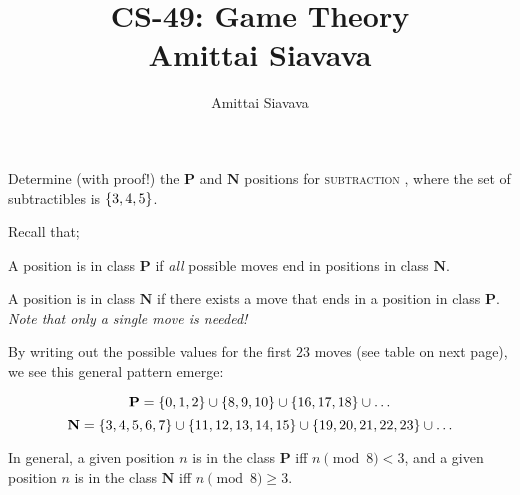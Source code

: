 \documentclass[11pt, reqno]{amsart}
\begin{document}

\title{CS-49: Game Theory\\ Amittai Siavava \\ }
\author{Amittai Siavava}


\setlength{\headheight}{13.0pt}
\setlength{\footskip}{15.0pt}

\maketitle

\bigskip

\def \cram { \textsc{cram} }
\def \dom { \textsc{domineering} }
\def \sub { \textsc{subtraction} }

\begin{problem}[5]
  Determine (with proof!) the $\mathbf{P}$ and $\mathbf{N}$ positions for \sub,
  where the set of subtractibles is $\left\{3,4,5\right\}$.

  \step
  Recall that;
  \begin{enumarabic}
    \item A position is in class $\mathbf{P}$ if \emph{all} possible moves end in positions
      in class $\mathbf{N}$.
    \item A position is in class $\mathbf{N}$ if there exists a move that ends in a
      position in class $\mathbf{P}$.\\
      \emph{Note that only a single move is needed!}
  \end{enumarabic}

  By writing out the possible values for the first $23$ moves (see table on next page),
  we see this general pattern emerge:

  \[\mathbf{P} = \left\{ 0, 1, 2\right\} \cup \left\{8, 9, 10\right\} \cup \left\{16, 17, 18\right\} \cup \ldots \]
  \[\mathbf{N} = \left\{3, 4, 5, 6, 7\right\} \cup \left\{11, 12, 13, 14, 15\right\} \cup \left\{19, 20, 21, 22, 23\right\} \cup \ldots \]

  \step
  In general, a given position $n$ is in the class $\mathbf{P}$ iff $n \pmod{8} < 3$,
  and a given position $n$ is in the class $\mathbf{N}$ iff $n \pmod{8} \ge 3$.


\end{problem}
\end{document}
